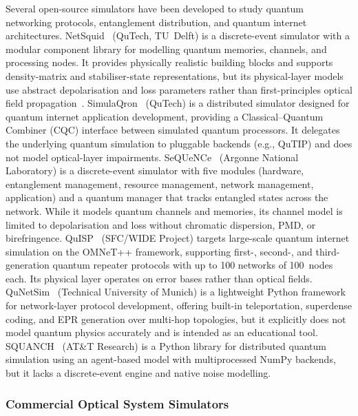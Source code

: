 \documentclass[11pt,a4paper]{article}
\begin{document}
Several open-source simulators have been developed to study quantum
networking protocols, entanglement distribution, and quantum internet
architectures.  NetSquid~\cite{netSquid} (QuTech, TU~Delft) is a
discrete-event simulator with a modular component library for modelling
quantum memories, channels, and processing nodes.  It provides physically
realistic building blocks and supports density-matrix and stabiliser-state
representations, but its physical-layer models use abstract depolarisation
and loss parameters rather than first-principles optical field
propagation~\cite{coopmans2021}.  SimulaQron~\cite{simulaqron} (QuTech)
is a distributed simulator designed for quantum internet application
development, providing a Classical--Quantum Combiner (CQC) interface
between simulated quantum processors.  It delegates the underlying
quantum simulation to pluggable backends (e.g., QuTIP) and does not
model optical-layer impairments.  SeQUeNCe~\cite{sequence} (Argonne
National Laboratory) is a discrete-event simulator with five modules
(hardware, entanglement management, resource management, network
management, application) and a quantum manager that tracks entangled
states across the network.  While it models quantum channels and
memories, its channel model is limited to depolarisation and loss
without chromatic dispersion, PMD, or birefringence.  QuISP~\cite{quisp}
(SFC/WIDE Project) targets large-scale quantum internet simulation
on the OMNeT++ framework, supporting first-, second-, and third-generation
quantum repeater protocols with up to 100 networks of 100~nodes each.
Its physical layer operates on error bases rather than optical fields.
QuNetSim~\cite{qunetsim} (Technical University of Munich) is a
lightweight Python framework for network-layer protocol development,
offering built-in teleportation, superdense coding, and EPR generation
over multi-hop topologies, but it explicitly does not model quantum
physics accurately and is intended as an educational tool.
SQUANCH~\cite{squanch} (AT\&T Research) is a Python library for
distributed quantum simulation using an agent-based model with
multiprocessed NumPy backends, but it lacks a discrete-event engine
and native noise modelling.

\subsubsection{Commercial Optical System Simulators}
\end{document}

